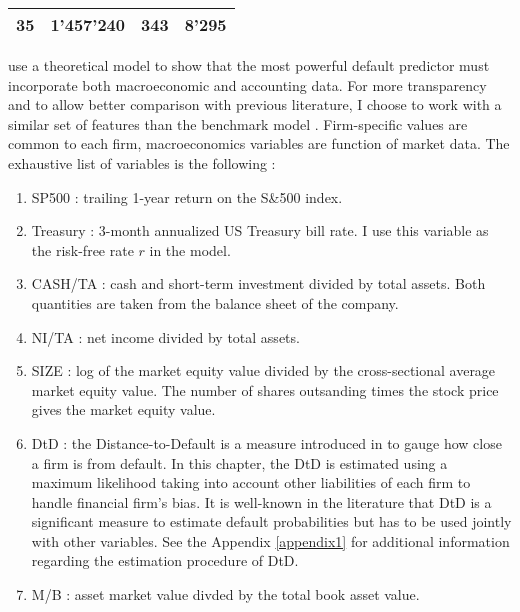 \begin{table}[]
\begin{tabular}{l l l l}
35 &  1'457'240 & 343 & 8'295 \\
\hline
    \end{tabular}
    \label{tab:observ}
\end{table}

\citet{leippold} use a theoretical model to show that the most powerful default predictor must incorporate both macroeconomic and accounting data. For more transparency and to allow better comparison with previous literature, I choose to work with a similar set of features than the benchmark model \citet{Duan2012}. Firm-specific values are common to each firm, macroeconomics variables are function of market data. The exhaustive list of variables is the following :

\clearpage 

\begin{enumerate}
\item SP500 : trailing 1-year return on the S\&500 index. 
\item Treasury : 3-month annualized US Treasury bill rate. I use this variable as the risk-free rate $r$ in the model. 
\item CASH/TA : cash and short-term investment divided by total assets. Both quantities are taken from the balance sheet of the company.
\item NI/TA : net income divided by total assets. 
\item SIZE : log of the market equity value divided by the cross-sectional average market equity value. The number of shares outsanding times the stock price gives the market equity value.
\item DtD : the Distance-to-Default is a measure introduced in \citet{Merton1974} to gauge how close a firm is from default. In this chapter, the DtD is estimated using a maximum likelihood taking into account other liabilities of each firm to handle financial firm's bias. It is well-known in the literature that DtD is a significant measure to estimate default probabilities but has to be used jointly with other variables. See the Appendix \ref{appendix1} for additional information regarding the estimation procedure of DtD.
\item M/B : asset market value divded by the total book asset value.
\end{enumerate}

